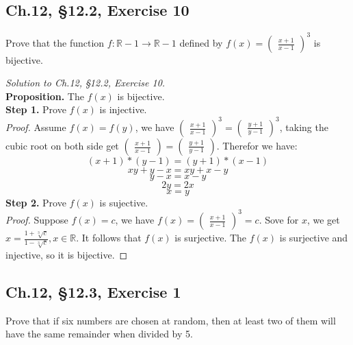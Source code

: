 \documentclass[12pt]{amsart}
\numberwithin{equation}{section}
\theoremstyle{definition}
\theoremstyle{remark}
\begin{document}


\subsection*{Ch.12, \S 12.2,  Exercise 10}  Prove that the function $ f: \mathbb{R} - {1} \rightarrow \mathbb{R} - {1} $ defined by $ f(x) = \begin{pmatrix} \frac{x + 1}{x - 1} \end{pmatrix}^3 $ is bijective.

\begin{proof}[Solution to Ch.12, \S 12.2,  Exercise 10] \ \\
\textbf{Proposition.} The $ f(x) $ is bijective.\\
\textbf{Step 1.} Prove $ f(x) $ is injective.\\
\textit{Proof.} Assume $ f(x) = f(y) $, we have $ \begin{pmatrix} \frac{x + 1}{x - 1} \end{pmatrix}^3 = \begin{pmatrix} \frac{y + 1}{y - 1} \end{pmatrix}^3 $, taking the cubic root on both side get $ \begin{pmatrix} \frac{x + 1}{x - 1} \end{pmatrix} = \begin{pmatrix} \frac{y + 1}{y - 1} \end{pmatrix} $. Therefor we have:
$$ (x + 1) * (y - 1) = (y + 1) * (x - 1) $$
$$ xy + y - x = xy + x - y $$
$$ y - x = x - y $$
$$ 2y = 2x $$
$$ x = y $$
\textbf{Step 2.} Prove $ f(x) $ is sujective. \\
\textit{Proof.} Suppose $ f(x) = c $, we have $ f(x) = \begin{pmatrix} \frac{x + 1}{x - 1} \end{pmatrix}^3 = c $. Sove for $ x $, we get $ x = \frac{1 + \sqrt[3]{c}}{1 - \sqrt[3]{c}}, x \in \mathbb{R} $. It follows that $ f(x) $ is surjective.
The $ f(x) $ is surjective and injective, so it is bijective.
\end{proof}





\subsection*{Ch.12, \S 12.3,  Exercise 1}  Prove that if six numbers are chosen at random, then at least two of them will have the same remainder when divided by 5.
\end{document}
